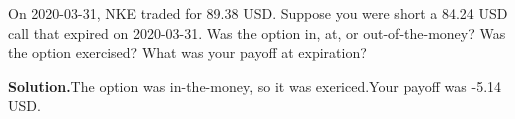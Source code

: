\noindent On 2020-03-31, NKE traded for 89.38 USD. Suppose you were short a 84.24 USD call that expired on 2020-03-31. Was the option in, at, or out-of-the-money? Was the option exercised? What was your payoff at expiration?

\vspace{9pt} 

\textbf{Solution.}The option was in-the-money, so it was exericed.Your payoff was -5.14 USD.